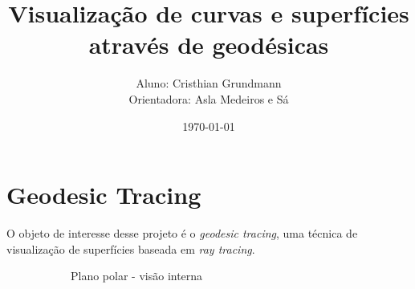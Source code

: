\documentclass[10pt,a4paper]{article}
\title{Visualização de curvas e superfícies através de geodésicas}
\author{Aluno: Cristhian Grundmann\\
Orientadora: Asla Medeiros e Sá}
\date{\today}
\begin{document}
\maketitle


\section*{Geodesic Tracing}
O objeto de interesse desse projeto é o \textit{geodesic tracing},
uma técnica de visualização de superfícies baseada em \textit{ray tracing}.

\begin{figure}[h!]
\centering
\begin{subfigure}{0.4\linewidth}
\caption{Plano polar - visão interna}
\end{subfigure}
\begin{subfigure}{0.4\linewidth}

\end{subfigure}
\end{figure}
\end{document}
